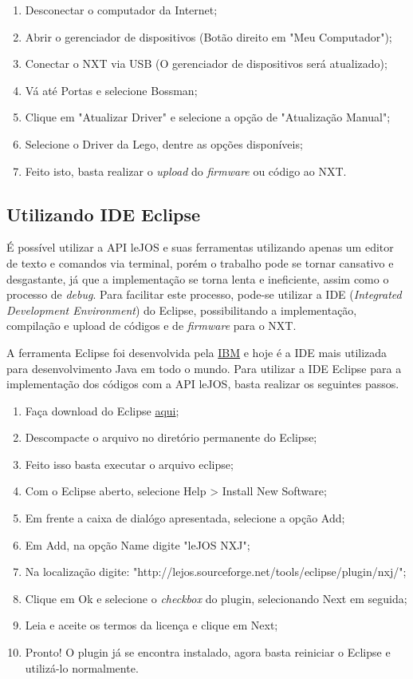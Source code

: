 \begin{enumerate}
	\item Desconectar o computador da Internet;
	\item Abrir o gerenciador de dispositivos (Botão direito em "Meu Computador");
	\item Conectar o NXT via USB (O gerenciador de dispositivos será atualizado);
	\item Vá até Portas e selecione Bossman;
	\item Clique em "Atualizar Driver" e selecione a opção de "Atualização Manual";
	\item Selecione o Driver da Lego, dentre as opções disponíveis;
	\item Feito isto, basta realizar o \textit{upload} do \textit{firmware} ou código ao NXT.
\end{enumerate}


\subsection{Utilizando IDE Eclipse} %
\label{sub:utilizando_ide_eclipse}

	É possível utilizar a API leJOS e suas ferramentas utilizando apenas um editor de texto e comandos via terminal, porém o trabalho pode se tornar cansativo e
	desgastante, já que a implementação se torna lenta e ineficiente, assim como o processo de \textit{debug}. Para facilitar este processo, pode-se utilizar
	a IDE (\textit{Integrated Development Environment}) do Eclipse, possibilitando a implementação, compilação e upload de códigos e de \textit{firmware} para o NXT.

	A ferramenta Eclipse foi desenvolvida pela \href{https://www.ibm.com/br-pt/}{IBM} e hoje é a IDE mais utilizada para desenvolvimento Java em todo o mundo.
	Para utilizar a IDE Eclipse para a implementação dos códigos com a API leJOS, basta realizar os seguintes passos.

	\begin{enumerate}
		\item Faça download do Eclipse \href{www.eclipse.org}{aqui};
		\item Descompacte o arquivo no diretório permanente do Eclipse;
		\item Feito isso basta executar o arquivo eclipse;
		\item Com o Eclipse aberto, selecione Help > Install New Software;
		\item Em frente a caixa de dialógo apresentada, selecione a opção Add;
		\item Em Add, na opção Name digite "leJOS NXJ";
		\item Na localização digite: "http://lejos.sourceforge.net/tools/eclipse/plugin/nxj/";
		\item Clique em Ok e selecione o \textit{checkbox} do plugin, selecionando Next em seguida;
		\item Leia e aceite os termos da licença e clique em Next;
		\item Pronto! O plugin já se encontra instalado, agora basta reiniciar o Eclipse e utilizá-lo normalmente.
	\end{enumerate}

